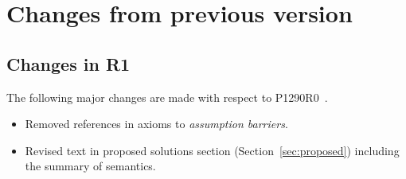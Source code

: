 \section{Changes from previous version}

\subsection{Changes in R1}

The following major changes are made with respect to P1290R0~\cite{p1290r0}.

\begin{itemize}
  \item Removed references in axioms to \emph{assumption barriers}.
  \item Revised text in proposed solutions section (Section~\ref{sec:proposed})
	including the summary of semantics.
\end{itemize}
